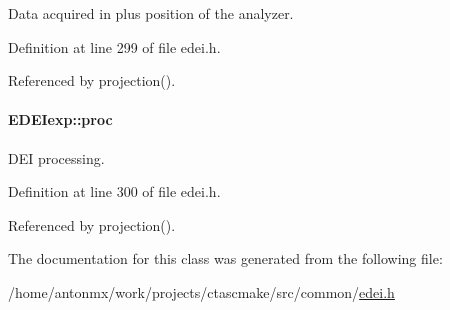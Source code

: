 Data acquired in plus position of the analyzer. 



Definition at line 299 of file edei.h.



Referenced by projection().

\hypertarget{classEDEIexp_a7aa29e6b8cac9a1df353717768bd6900}{
\paragraph[{proc}]{ {\bf EDEIexp::proc}}\hfill}
\label{classEDEIexp_a7aa29e6b8cac9a1df353717768bd6900}


DEI processing. 



Definition at line 300 of file edei.h.



Referenced by projection().



The documentation for this class was generated from the following file:\begin{DoxyCompactItemize}
\item 
/home/antonmx/work/projects/ctascmake/src/common/\hyperlink{edei_8h}{edei.h}\end{DoxyCompactItemize}
